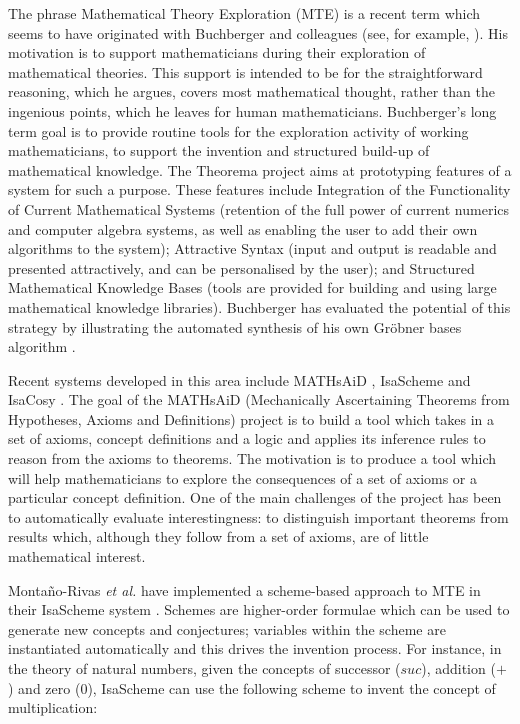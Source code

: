 The phrase Mathematical Theory Exploration (MTE) is a recent term
which seems to have originated with Buchberger and colleagues (see,
for example, \cite{buchberger}). His motivation is to support
mathematicians during their exploration of mathematical theories. This
support is intended to be for the straightforward reasoning, which he
argues, covers most mathematical thought, rather than the ingenious
points, which he leaves for human mathematicians. Buchberger's long
term goal is to provide routine tools for the exploration activity of
working mathematicians, to support the invention and structured
build-up of mathematical knowledge. The Theorema project aims at
prototyping features of a system for such a purpose. These features
include Integration of the Functionality of Current Mathematical
Systems (retention of the full power of current numerics and computer
algebra systems, as well as enabling the user to add their own
algorithms to the system); Attractive Syntax (input and output is
readable and presented attractively, and can be personalised by the
user); and Structured Mathematical Knowledge Bases (tools are provided
for building and using large mathematical knowledge
libraries). Buchberger has evaluated the potential of this strategy by
illustrating the automated synthesis of his own Gr\"obner bases
algorithm \cite{buchberger:04}.

Recent systems developed in this area include MATHsAiD \cite{roy},
IsaScheme \cite{MontanoRivas2011} and IsaCosy \cite{johansson}. The
goal of the MATHsAiD (Mechanically Ascertaining Theorems from
Hypotheses, Axioms and Definitions) project is to build a tool which
takes in a set of axioms, concept definitions and a logic and applies
its inference rules to reason from the axioms to theorems. The
motivation is to produce a tool which will help mathematicians to
explore the consequences of a set of axioms or a particular concept
definition. One of the main challenges of the project has been to
automatically evaluate interestingness: to distinguish important
theorems from results which, although they follow from a set of
axioms, are of little mathematical interest.

Monta{\~n}o-Rivas {\em et al.} have implemented a scheme-based
approach to MTE in their IsaScheme system
\cite{MontanoRivas2011}. Schemes are higher-order formulae which can
be used to generate new concepts and conjectures; variables within the
scheme are instantiated automatically and this drives the invention
process.  For instance, in the theory of natural numbers, given the
concepts of successor ($suc$), addition ($+$) and zero ($0$),
IsaScheme can use the following scheme to invent the concept of
multiplication:

